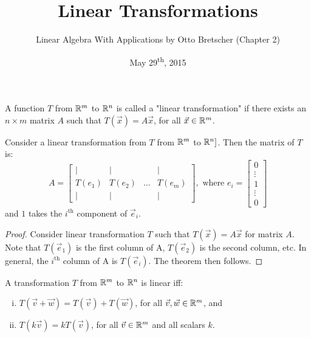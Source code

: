 \documentclass[a4paper,11pt]{article}
\title{Linear Transformations}
\author{Linear Algebra With Applications by Otto Bretscher (Chapter 2)}
\date{May 29\textsuperscript{th}, 2015}
\begin{document}
\maketitle
{}

\begin{outline}


    A function \(T\) from \(\mathbb{R}^m\) to \(\mathbb{R}^n\) is called a "linear transformation" if there exists 
    an \(n \times m\) matrix \(A\) such that \(T(\vec{x}) = A\vec{x}\), for all \(\vec{x} \in \mathbb{R}^m\).
    
    Consider a linear transformation from \(T\) from \(\mathbb{R}^m\) to \(\mathbb{R}^n]\). Then the matrix of \(T\) is:
    \[
      A = 
        \begin{bmatrix} 
          \vert  & \vert  &        & \vert  \\
          T(e_1) & T(e_2) & \ldots & T(e_m) \\
          \vert  & \vert  &        & \vert
        \end{bmatrix}
      ,\text{ where } e_{i} = \begin{bmatrix} 0 \\ \vdots \\ 1 \\ \vdots \\ 0 \end{bmatrix}
    \]
    and \(1\) takes the \(i^{\text{th}}\) component of \(\vec{e}_i\).
    
    \begin{proof}
      Consider linear transformation \(T\) such that \(T(\vec{x}) = A\vec{x}\) for matrix \(A\). Note that
      \(T(\vec{e}_1)\) is the first column of A, \(T(\vec{e}_2)\) is the second column, etc. In general, the
      \(i^{\text{th}}\) column of A is \(T(\vec{e}_i)\). The theorem then follows.
    \end{proof}
    
    A transformation \(T\) from \(\mathbb{R}^m\) to \(\mathbb{R}^n\) is linear iff:
    \begin{enumerate}[i.]
      \item \(T(\vec{v} + \vec{w}) = T(\vec{v}) + T(\vec{w})\), for all \(\vec{v}, \vec{w} \in \mathbb{R}^m\), and
      \item \(T(k\vec{v}) = kT(\vec{v})\), for all \(\vec{v} \in \mathbb{R}^m\) and all scalars \(k\).
    \end{enumerate}
    

\end{outline}
\end{document}
